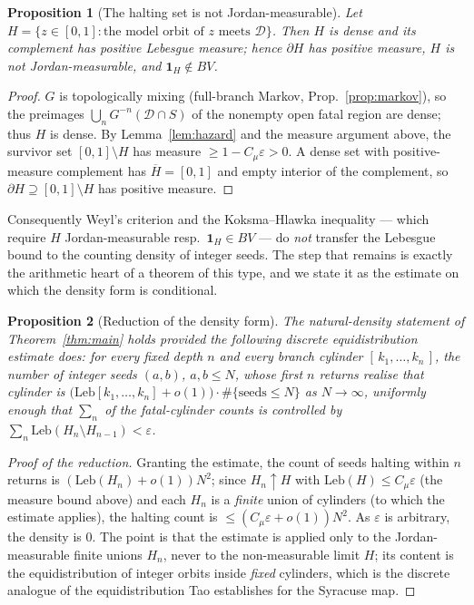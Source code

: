 \documentclass[11pt]{article}
\newtheorem{proposition}{Proposition}\newtheorem{corollary}{Corollary}
\theoremstyle{definition}\newtheorem{definition}{Definition}
\theoremstyle{remark}\newtheorem{remark}{Remark}
\newcommand{\D}{\mathcal D}\newcommand{\Leb}{\mathrm{Leb}}
\begin{document}
\begin{proposition}[The halting set is not Jordan-measurable]\label{prop:notJM}
Let $H=\{z\in[0,1]:\text{the model orbit of }z\text{ meets }\D\}$. Then $H$
is dense and its complement has positive Lebesgue measure; hence $\partial H$
has positive measure, $H$ is not Jordan-measurable, and $\mathbf 1_H\notin
BV$.
\end{proposition}
\begin{proof}
$G$ is topologically mixing (full-branch Markov, Prop.~\ref{prop:markov}), so
the preimages $\bigcup_n G^{-n}(\D\cap S)$ of the nonempty open fatal region
are dense; thus $H$ is dense. By Lemma~\ref{lem:hazard} and the measure
argument above, the survivor set $[0,1]\setminus H$ has measure $\ge1-C_\mu
\varepsilon>0$. A dense set with positive-measure complement has
$\overline H=[0,1]$ and empty interior of the complement, so $\partial H
\supseteq[0,1]\setminus H$ has positive measure.
\end{proof}

Consequently Weyl's criterion and the Koksma--Hlawka inequality --- which
require $H$ Jordan-measurable resp.\ $\mathbf 1_H\in BV$ --- do \emph{not}
transfer the Lebesgue bound to the counting density of integer seeds. The
step that remains is exactly the arithmetic heart of a theorem of this type,
and we state it as the estimate on which the density form is conditional.

\begin{proposition}[Reduction of the density form]\label{prop:density}
The natural-density statement of Theorem~\ref{thm:main} holds provided the
following discrete equidistribution estimate does: for every fixed depth $n$
and every branch cylinder $[\,k_1,\dots,k_n\,]$, the number of integer seeds
$(a,b)$, $a,b\le N$, whose first $n$ returns realise that cylinder is
$\bigl(\Leb[k_1,\dots,k_n]+o(1)\bigr)\cdot\#\{\text{seeds}\le N\}$ as
$N\to\infty$, uniformly enough that $\sum_n$ of the fatal-cylinder counts is
controlled by $\sum_n\Leb(H_n\setminus H_{n-1})<\varepsilon$.
\end{proposition}
\begin{proof}[Proof of the reduction]
Granting the estimate, the count of seeds halting within $n$ returns is
$(\Leb(H_n)+o(1))N^2$; since $H_n\uparrow H$ with $\Leb(H)\le C_\mu\varepsilon$
(the measure bound above) and each $H_n$ is a \emph{finite} union of
cylinders (to which the estimate applies), the halting count is
$\le(C_\mu\varepsilon+o(1))N^2$. As $\varepsilon$ is arbitrary, the density
is $0$. The point is that the estimate is applied only to the
Jordan-measurable finite unions $H_n$, never to the non-measurable limit $H$;
its content is the equidistribution of integer orbits inside \emph{fixed}
cylinders, which is the discrete analogue of the equidistribution Tao
establishes for the Syracuse map.
\end{proof}
\end{document}

